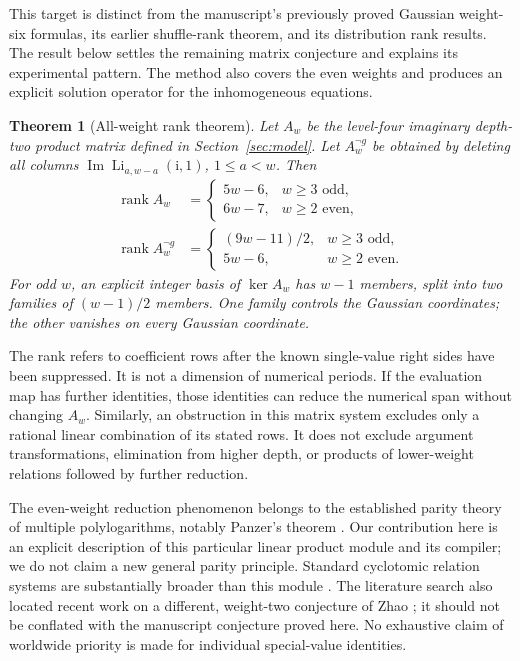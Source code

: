\documentclass[11pt,a4paper]{article}
\numberwithin{equation}{section}
\newtheorem{theorem}{Theorem}[section]
\theoremstyle{definition}\newtheorem{definition}[theorem]{Definition}
\theoremstyle{remark}\newtheorem{remark}[theorem]{Remark}
\newcommand{\ii}{\mathrm i}
\newcommand{\Li}{\operatorname{Li}}
\newcommand{\Imag}{\operatorname{Im}}
\newcommand{\rank}{\operatorname{rank}}
\begin{document}
This target is distinct from the manuscript's previously proved Gaussian
weight-six formulas, its earlier shuffle-rank theorem, and its distribution
rank results. The result below settles the remaining matrix conjecture and
explains its experimental pattern. The method also covers the even weights
and produces an explicit solution operator for the inhomogeneous equations.

\begin{theorem}[All-weight rank theorem]\label{thm:main}
Let $A_w$ be the level-four imaginary depth-two product matrix defined in
Section~\ref{sec:model}. Let $A_w^{\neg g}$ be obtained by deleting all columns
$\Imag\Li_{a,w-a}(\ii,1)$, $1\le a<w$. Then
\begin{align}
\rank A_w&=
\begin{cases}
5w-6,&w\ge3\text{ odd},\\
6w-7,&w\ge2\text{ even},
\end{cases}\label{eq:main-rank}\\
\rank A_w^{\neg g}&=
\begin{cases}
(9w-11)/2,&w\ge3\text{ odd},\\
5w-6,&w\ge2\text{ even}.
\end{cases}\label{eq:main-nong}
\end{align}
For odd $w$, an explicit integer basis of $\ker A_w$ has $w-1$ members,
split into two families of $(w-1)/2$ members. One family controls the Gaussian
coordinates; the other vanishes on every Gaussian coordinate.
\end{theorem}

The rank refers to coefficient rows after the known single-value right sides
have been suppressed. It is not a dimension of numerical periods. If the
evaluation map has further identities, those identities can reduce the
numerical span without changing $A_w$. Similarly, an obstruction in this
matrix system excludes only a rational linear combination of its stated
rows. It does not exclude argument transformations, elimination from higher
depth, or products of lower-weight relations followed by further reduction.

The even-weight reduction phenomenon belongs to the established parity theory
of multiple polylogarithms, notably Panzer's theorem \cite{panzer}. Our
contribution here is an explicit description of this particular linear
product module and its compiler; we do not claim a new general parity
principle. Standard cyclotomic relation systems are substantially broader
than this module \cite{zhao}. The literature search also located recent work
on a different, weight-two conjecture of Zhao \cite{bachmann}; it should not
be conflated with the manuscript conjecture proved here. No exhaustive claim
of worldwide priority is made for individual special-value identities.
\end{document}
